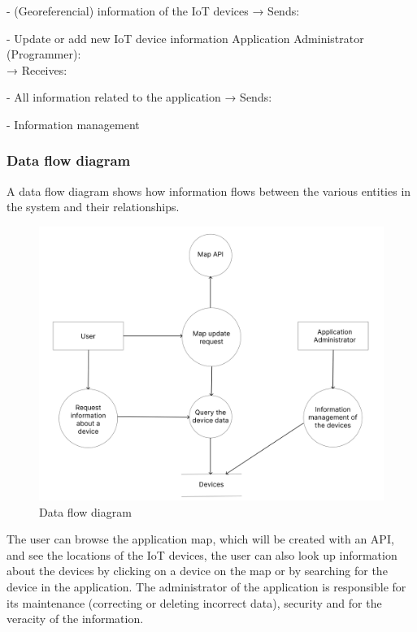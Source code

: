 - (Georeferencial) information of the IoT devices
\newline
→ Sends:

- Update or add new IoT device information \newline
\newline
Application Administrator (Programmer): \\
\newline
→ Receives:

- All information related to the application
\newline
→ Sends:

- Information management

\subsubsection*{Data flow diagram}

A data flow diagram shows how information flows between the various entities
in the system and their relationships.
\begin{figure}[H]
    \centering
    \includegraphics[width=15cm]{../app/docs/software_requirements/assets/images/data_flow_diagram.png}
    \caption{Data flow diagram}
    \label{fig:data flow diagram}
\end{figure}
The user can browse the application map, which will be created with an API,
and see the locations of the IoT devices, the user can also look up information
about the devices by clicking on a device on the map or by searching for
the device in the application. The administrator of the application is responsible for
its maintenance (correcting or deleting incorrect data), security and for
the veracity of the information.

